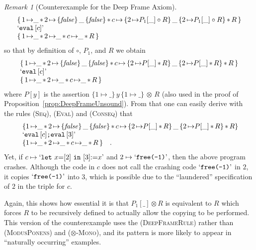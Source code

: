 \documentclass{LMCS}
\theoremstyle{remark}
\newtheorem{remark}[theorem]{Remark}
\newcommand{\QUOTE}[1]{\textnormal{`\ensuremath{#1}'}}
\newcommand{\UNQUOTE}[1]{\SYN{eval}\,{#1}}
\newcommand{\SYN}[1]{\ensuremath{\texttt{#1}}}
\newcommand{\triple}[3]{{\ensuremath{\!\left.\{ #1 \}\, #2\, \{  #3 \}\!\right.}}}
\newcommand{\False}{\ensuremath{\mathit{false}}}
\newcommand{\pointsto}{\ensuremath{\mapsto}}
\newcommand{\ntria}[4]{{{#1}\,{\mapsto}\,{{\{{#2}\}}{\, #3\, }{\{{#4}\}}}}\xspace}
\begin{document}
\begin{remark}[Counterexample for the Deep Frame Axiom]
\[
\begin{array}{l}
    \{\,  1\,{\pointsto} \_  \, {*} \, \ntria{2}{\False}{\_}{\False}\, {*}\, \ntria{c}{ {2\, {\pointsto} P_1[\_]}\circ R}{\_}{2\,{\pointsto} P_1[\_]\circ R } \, {*}\, R\, \}\\
    \QUOTE{\UNQUOTE{[c]}} \\
    \{\, 1\,{\pointsto} \_  \, {*} \, 2\,{\pointsto}\_\, {*}\,  c\,{\pointsto} \_  \, {*} \, R\, \}
\end{array} \vspace{0.2cm}
\]
so that by definition of  $\circ$, $P_1$, and $R$ we obtain
\[ \vspace{0.2cm}\begin{array}{l}
    \{\,  1\,{\pointsto} \_  \, {*} \, \ntria{2}{\False}{\_}{\False}\, {*}\, \ntria{c}{ {2\, {\pointsto} P[\_]}\, {*}\, R}{\_}{2\,{\pointsto} P[\_] \, {*}\, R } \, {*}\, R\, \}\\
   \QUOTE{ \UNQUOTE{[c]}}\\
    \{\, 1\,{\pointsto} \_  \, {*} \, 2\,{\pointsto}\_\, {*}\,  c\,{\pointsto} \_  \, {*} \, R\, \}
\end{array} \vspace{0.1cm}
\]
where $P[y]$ is the assertion 
$\triple{1{\pointsto}\_}{y}{1{\pointsto}\_}\,{\otimes}\,R$
(also used in the proof of Proposition~\ref{prop:DeepFrameUnsound}).
From that  one can easily derive with the rules  \textsc{(Seq)}, \textsc{(Eval)} and \textsc{(Conseq)}  that
 \[ \ \vspace{0.2cm}\begin{array}{l}
    \{1\, {\pointsto} \_  \, {*} \,\ntria{2}{\False}{\_}{\False}\, {*}\, \ntria{c}{ {2\, {\pointsto} P[\_]} \, {*} \, R}{\_}{2\,{\pointsto} P[\_]\, {*}\,  R }\, {*}\, R \}\\
   \QUOTE{ \UNQUOTE{[c]}\SYN{;}    \UNQUOTE{[3]}} \\
    \{ 1\,{\pointsto} \_  \, {*} \, 2\,{\pointsto}\_\, {*}\,  c\,{\pointsto} \_  \, {*} \, R\, \} \quad .
\end{array} \vspace{0.1cm}
\] 
Yet, if $c\pointsto \QUOTE{\SYN{let}~x{=}[2]~\SYN{in}~[3]{:=}x}$
and $2\pointsto \QUOTE{\SYN{free(-1)}}$, then the above program crashes. 
Although the code in $c$ does not call the crashing code 
$\QUOTE{\SYN{free(-1)}}$ in $2$, it copies $\QUOTE{\SYN{free(-1)}}$ 
into $3$, which is possible due to the ``laundered'' specification of $2$ in the triple for $c$. 


Again, this shows how essential it is that $P_1[\_]\otimes R $ is equivalent to $R$ which forces $R$ to be recursively defined to actually allow the copying to be performed. This version of the counterexample uses the (\textsc{DeepFrameRule}) rather than (\textsc{ModusPonens}) and (\textsc{$\otimes$-Mono}), and its pattern  is more likely to appear in ``naturally occurring'' examples.
 \end{remark}
 
\end{document}

